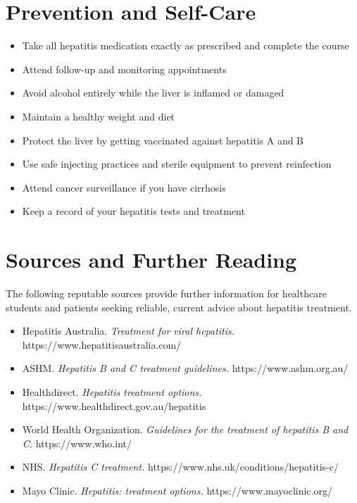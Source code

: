 \section*{Prevention and Self-Care}
\begin{itemize}
    \item Take all hepatitis medication exactly as prescribed and complete the course
    \item Attend follow-up and monitoring appointments
    \item Avoid alcohol entirely while the liver is inflamed or damaged
    \item Maintain a healthy weight and diet
    \item Protect the liver by getting vaccinated against hepatitis A and B
    \item Use safe injecting practices and sterile equipment to prevent reinfection
    \item Attend cancer surveillance if you have cirrhosis
    \item Keep a record of your hepatitis tests and treatment
\end{itemize}

\section*{Sources and Further Reading}
The following reputable sources provide further information for healthcare students and patients seeking reliable, current advice about hepatitis treatment.

\begin{itemize}
    \item Hepatitis Australia. \textit{Treatment for viral hepatitis.} https://www.hepatitisaustralia.com/
    \item ASHM. \textit{Hepatitis B and C treatment guidelines.} https://www.ashm.org.au/
    \item Healthdirect. \textit{Hepatitis treatment options.} https://www.healthdirect.gov.au/hepatitis
    \item World Health Organization. \textit{Guidelines for the treatment of hepatitis B and C.} https://www.who.int/
    \item NHS. \textit{Hepatitis C treatment.} https://www.nhs.uk/conditions/hepatitis-c/
    \item Mayo Clinic. \textit{Hepatitis: treatment options.} https://www.mayoclinic.org/
\end{itemize}
